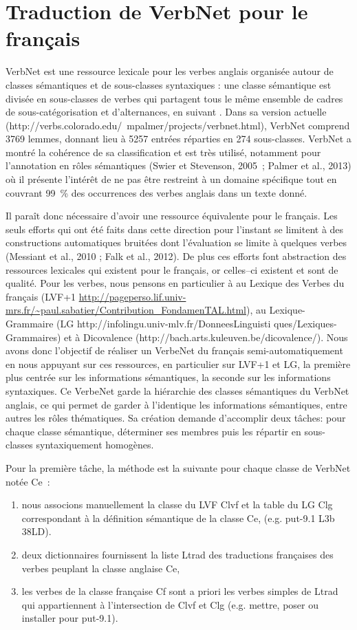 \chapter{Traduction de VerbNet pour le français}
\label{ch:verbnet}


VerbNet est une ressource lexicale pour les verbes anglais organisée autour de classes sémantiques et de sous-classes syntaxiques : une classe sémantique est divisée en sous-classes de verbes qui partagent tous le même ensemble de cadres de sous-catégorisation et d'alternances, en suivant \cite{levin1993english}. Dans sa version actuelle (http://verbs.colorado.edu/~mpalmer/projects/verbnet.html), VerbNet comprend 3769 lemmes, donnant lieu à 5257 entrées réparties en 274 sous-classes. VerbNet a montré la cohérence de sa classification et est très utilisé, notamment pour l'annotation en rôles sémantiques (Swier et Stevenson, 2005 ; Palmer et al., 2013) où il présente l'intérêt de ne pas être restreint à un domaine spécifique tout en couvrant 99~\% des occurrences des verbes anglais dans un texte donné.

Il paraît donc nécessaire d'avoir une ressource équivalente pour le français. Les seuls efforts qui ont été faits dans cette direction pour l'instant se limitent à des constructions automatiques bruitées dont l'évaluation se limite à quelques verbes (Messiant et al., 2010 ; Falk et al., 2012). De plus ces efforts font abstraction des ressources lexicales qui existent pour le français, or celles–ci existent et sont de qualité. Pour les verbes, nous pensons en particulier à au Lexique des Verbes du français (LVF+1 \url{http://pageperso.lif.univ-mrs.fr/~paul.sabatier/Contribution_FondamenTAL.html}), au Lexique-Grammaire (LG http://infolingu.univ-mlv.fr/DonneesLinguisti ques/Lexiques-Grammaires) et à Dicovalence (http://bach.arts.kuleuven.be/dicovalence/). Nous avons donc l'objectif de réaliser un VerbeNet du français semi-automatiquement en nous appuyant sur ces ressources, en particulier sur LVF+1 et LG, la première plus centrée sur les informations sémantiques, la seconde sur les informations syntaxiques. Ce VerbeNet garde la hiérarchie des classes sémantiques du VerbNet anglais, ce qui permet de garder à l'identique les informations sémantiques, entre autres les rôles thématiques. Sa création demande d'accomplir deux tâches: pour chaque classe sémantique, déterminer ses membres puis les répartir en sous-classes syntaxiquement homogènes.

Pour la première tâche, la méthode est la suivante pour chaque classe de VerbNet notée Ce :
\begin{enumerate}
    \item nous associons manuellement la classe du LVF Clvf et la table du LG Clg correspondant à la définition sémantique de la classe Ce, (e.g. put-9.1 L3b 38LD).
    \item deux dictionnaires fournissent la liste Ltrad des traductions françaises des verbes peuplant la classe anglaise Ce, 
    \item les verbes de la classe française Cf sont a priori les verbes simples de Ltrad qui appartiennent à l'intersection de Clvf et Clg (e.g. mettre, poser ou installer pour put-9.1).
\end{enumerate}

